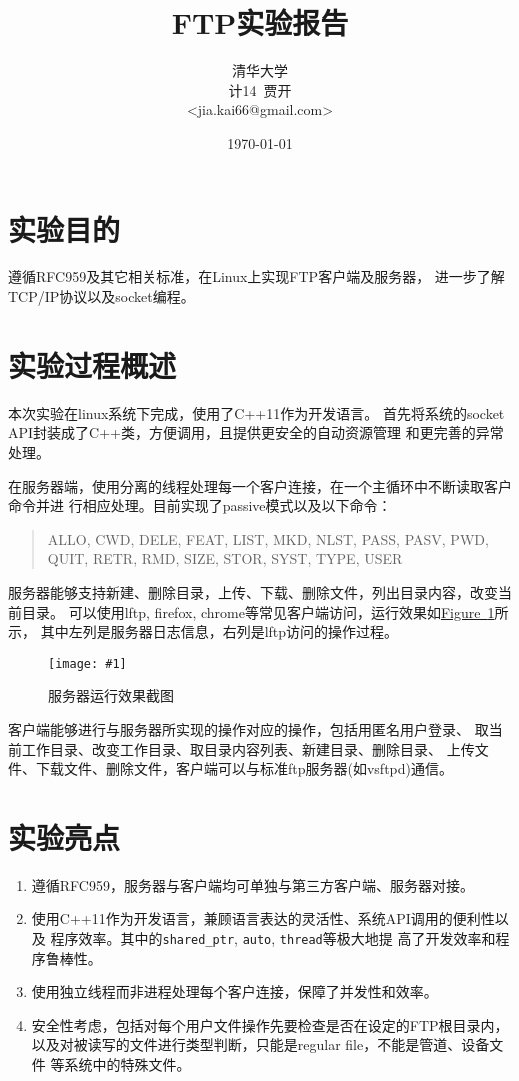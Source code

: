 \documentclass[a4paper]{article}
\title{FTP实验报告}
\author{清华大学\\计14~贾开\\<jia.kai66@gmail.com>}
\date{\today}
\newcommand{\addplot}[1]{\begin{center}
	\texttt{[image: \#1]}
\end{center}}
\newcommand{\figref}[1]{\hyperref[fig:#1]{Figure~\ref*{fig:#1}}}
\begin{document}
\maketitle
\tableofcontents

\section{实验目的}
遵循RFC959及其它相关标准，在Linux上实现FTP客户端及服务器，
进一步了解TCP/IP协议以及socket编程。

\section{实验过程概述}
本次实验在linux系统下完成，使用了C++11作为开发语言。
首先将系统的socket API封装成了C++类，方便调用，且提供更安全的自动资源管理
和更完善的异常处理。

在服务器端，使用分离的线程处理每一个客户连接，在一个主循环中不断读取客户命令并进
行相应处理。目前实现了passive模式以及以下命令： 
\begin{quote}
	ALLO, CWD, DELE, FEAT, LIST, MKD, NLST, PASS, PASV, PWD, QUIT, RETR, RMD,
	SIZE, STOR, SYST, TYPE, USER
\end{quote}

服务器能够支持新建、删除目录，上传、下载、删除文件，列出目录内容，改变当前目录。
可以使用lftp, firefox, chrome等常见客户端访问，运行效果如\figref{server}所示，
其中左列是服务器日志信息，右列是lftp访问的操作过程。
\begin{figure}[h!]
	\addplot{../img/server.png}
	\caption{\label{fig:server}服务器运行效果截图}
\end{figure}

客户端能够进行与服务器所实现的操作对应的操作，包括用匿名用户登录、
取当前工作目录、改变工作目录、取目录内容列表、新建目录、删除目录、
上传文件、下载文件、删除文件，客户端可以与标准ftp服务器(如vsftpd)通信。


\section{实验亮点}
\begin{enumerate}
	\item 遵循RFC959，服务器与客户端均可单独与第三方客户端、服务器对接。
	\item 使用C++11作为开发语言，兼顾语言表达的灵活性、系统API调用的便利性以及
		程序效率。其中的\verb|shared_ptr|, \verb|auto|, \verb|thread|等极大地提
		高了开发效率和程序鲁棒性。
	\item 使用独立线程而非进程处理每个客户连接，保障了并发性和效率。
	\item 安全性考虑，包括对每个用户文件操作先要检查是否在设定的FTP根目录内，
		以及对被读写的文件进行类型判断，只能是regular file，不能是管道、设备文件
		等系统中的特殊文件。
\end{enumerate}
\end{document}
